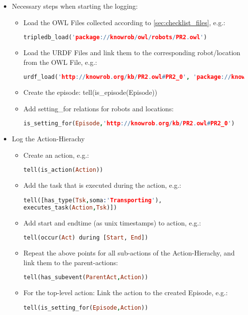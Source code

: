 \begin{itemize}
	\item Necessary steps when starting the logging:
	\begin{itemize}
		\item Load the OWL Files collected according to \ref{sec:checklist_files}, e.g.: 
			\begin{lstlisting}[language=Prolog]
tripledb_load('package://knowrob/owl/robots/PR2.owl')
			\end{lstlisting}
		\item Load the URDF Files and link them to the corresponding robot/location from the OWL File, e.g.:
		\begin{lstlisting}[language=Prolog]
urdf_load('http://knowrob.org/kb/PR2.owl#PR2_0', 'package://knowrob/urdf/pr2.urdf', [load_rdf])
		\end{lstlisting}
		\item Create the episode: tell(is\_episode(Episode))
		\item Add setting\_for relations for robots and locations: 
		\begin{lstlisting}[language=Prolog]
is_setting_for(Episode,'http://knowrob.org/kb/PR2.owl#PR2_0')
		\end{lstlisting}
	\end{itemize}
	\item Log the Action-Hierachy
	\begin{itemize}
		\item Create an action, e.g.:
			\begin{lstlisting}[language=Prolog]
tell(is_action(Action))
			\end{lstlisting}
		\item Add the task that is executed during the action, e.g.: 
			\begin{lstlisting}[language=Prolog]
tell([has_type(Tsk,soma:'Transporting'),
executes_task(Action,Tsk)])
			\end{lstlisting}
		\item Add start and endtime (as unix timestamps) to action, e.g.: 
			\begin{lstlisting}[language=Prolog]
tell(occur(Act) during [Start, End])
			\end{lstlisting}
		\item Repeat the above points for all sub-actions of the Action-Hierachy, and link them to the parent-actions:
			\begin{lstlisting}[language=Prolog]
tell(has_subevent(ParentAct,Action))
			\end{lstlisting}
		\item For the top-level action: Link the action to the created Episode, e.g.: 
			\begin{lstlisting}[language=Prolog]
tell(is_setting_for(Episode,Action))
			\end{lstlisting}
	\end{itemize}
\end{itemize}

